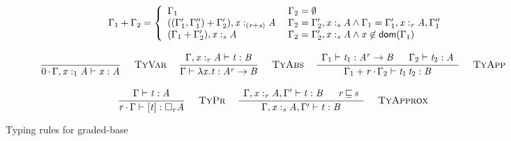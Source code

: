 \begin{definition}\label{def:contextAdd}

\begin{align*}
\Gamma_{{\mathrm{1}}}  \GRANULEsym{+}  \Gamma_{{\mathrm{2}}} = \left\{\begin{matrix}
    \begin{array}{ll}
    \Gamma_{{\mathrm{1}}} &
    \Gamma_{{\mathrm{2}}} = \emptyset
             \\
      ((\Gamma'_{{\mathrm{1}}}, \Gamma''_{{\mathrm{1}}}) + \Gamma'_{{\mathrm{2}}}), \GRANULEmv{x}  :_{\textcolor{coeffectColor}{  \GRANULEsym{(}  \GRANULEnt{r}  \GRANULEsym{+}  \GRANULEnt{s}  \GRANULEsym{)}  } }   \GRANULEnt{A} \; &
\Gamma_{{\mathrm{2}}} = \Gamma'_{{\mathrm{2}}}  \GRANULEsym{,}   \GRANULEmv{x}  :_{\textcolor{coeffectColor}{  \GRANULEnt{s}  } }   \GRANULEnt{A} \wedge \Gamma_{{\mathrm{1}}} = \Gamma'_{{\mathrm{1}}}  \GRANULEsym{,}   \GRANULEmv{x}  :_{\textcolor{coeffectColor}{  \GRANULEnt{r}  } }   \GRANULEnt{A},\Gamma''_{{\mathrm{1}}} \\
 \GRANULEsym{(}  \Gamma_{{\mathrm{1}}}  \GRANULEsym{+}  \Gamma'_{{\mathrm{2}}}  \GRANULEsym{)}  \GRANULEsym{,}   \GRANULEmv{x}  :_{\textcolor{coeffectColor}{  \GRANULEnt{s}  } }   \GRANULEnt{A} & \Gamma_{{\mathrm{2}}} = \Gamma'_{{\mathrm{2}}}  \GRANULEsym{,}   \GRANULEmv{x}  :_{\textcolor{coeffectColor}{  \GRANULEnt{s}  } }   \GRANULEnt{A} \wedge \GRANULEmv{x} \not\in \mathsf{dom}(\Gamma_{{\mathrm{1}}})
\end{array}
  \end{matrix}\right.
\end{align*}
\end{definition}

\begin{figure}[H]
\hspace{-0.5em}
\begin{align*}
\hspace{-0.5em}
\begin{array}{c}
\GRANULEdruleTyVar{}
\;\;\;
\GRANULEdruleTyAbs{}
\;\;\;
\GRANULEdruleTyApp{}
\\\\
\GRANULEdruleTyPr{}
\;\;\;
\GRANULEdruleTyApprox{}
\end{array}
\end{align*}
\vspace{-0.5em}
\caption{Typing rules for graded-base}
\label{fig:typing}
\vspace{-0.5em}
 \end{figure}

